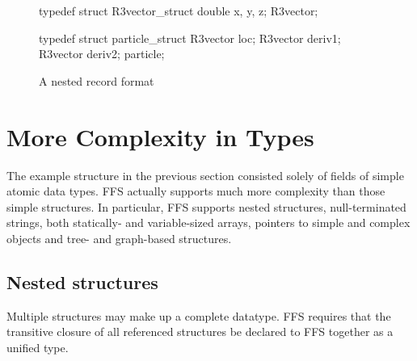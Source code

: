 \begin{figure}
\vspace*{-0.25in}
\begin{WrapCode}
 typedef struct R3vector_struct { 
     double x, y, z;
 } R3vector;

 typedef struct particle_struct { 
     R3vector   loc;
     R3vector   deriv1;
     R3vector   deriv2;
 } particle;
\end{WrapCode}
\caption{A nested record format\label{fig:part}}
\end{figure}
\section{More Complexity in Types}
The example structure in the previous section consisted solely of fields of
simple atomic data types.  FFS actually supports much more complexity than
those simple structures.  In particular, FFS supports nested structures,
null-terminated strings, both statically- and variable-sized arrays,
pointers to simple and complex objects and  tree-
and graph-based structures.

\subsection{Nested structures\label{sec:nested}}
Multiple structures may make up a complete datatype.  FFS requires that the
transitive closure of all referenced structures be declared to FFS together
as a unified type.

